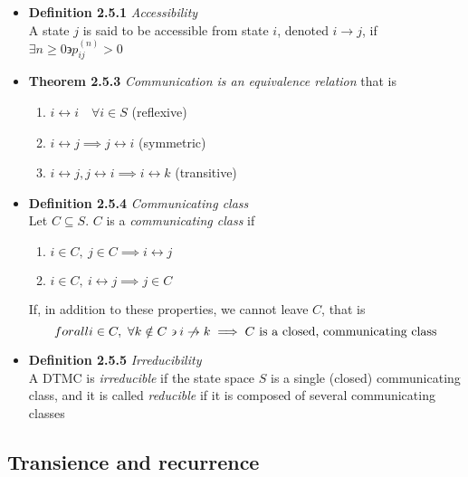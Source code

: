 \documentclass[11pt,a4paper]{article}
\begin{document}
\begin{itemize}

    \item \textbf{Definition 2.5.1} \emph{Accessibility} \\
        A state $j$ is said to be accessible from state $i$, denoted $i \rightarrow j$, if
        $\exists n \geq 0 \backepsilon p_{ij}^{(n)} > 0$

    \item \textbf{Theorem 2.5.3} \emph{Communication is an equivalence relation}
        that is
        \begin{enumerate}
            \item $i \leftrightarrow i \quad \forall i \in S$ (reflexive)
            \item $i \leftrightarrow j \implies j \leftrightarrow i$ (symmetric)
            \item $i \leftrightarrow j, j \leftrightarrow i \implies i \leftrightarrow k$
                (transitive)
        \end{enumerate}

    \item \textbf{Definition 2.5.4} \emph{Communicating class} \\
        Let $C \subseteq S$. $C$ is a \emph{communicating class} if
        \begin{enumerate}
            \item $i \in C,\ j \in C \implies i \leftrightarrow j$
            \item $i \in C,\ i \leftrightarrow j \implies j \in C$
        \end{enumerate}
        If, in addition to these properties, we cannot leave $C$, that is
        \[
            forall i \in C,\ \forall k \notin C \backepsilon i \centernot\rightarrow k
            \implies C \text{ is a closed, communicating class}
        \]

    \item \textbf{Definition 2.5.5} \emph{Irreducibility} \\
        A DTMC is \emph{irreducible} if the state space $S$ is a single (closed)
        communicating class, and it is called \emph{reducible} if it is composed of several
        communicating classes

\end{itemize}

\subsection{Transience and recurrence}
\end{document}
